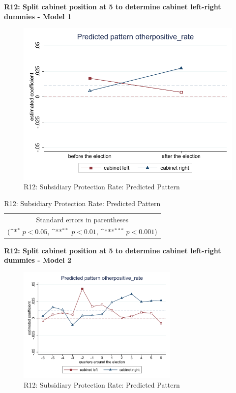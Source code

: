 \documentclass[10pt,a4paper]{scrartcl}
\begin{document}
\clearpage
\textbf{R12: Split cabinet position at 5 to determine cabinet left-right dummies - Model 1}
\begin{figure}[!ht]
	\centering
	\includegraphics[width=1\textwidth]{figures_edited/otherpositive_rate_graph1_R12.pdf}
	\caption{R12: Subsidiary Protection Rate: Predicted Pattern}
\end{figure}

\begin{table}[!ht]\centering
	\renewcommand{\arraystretch}{1.25}
	\def\sym#1{\ifmmode^{#1}\else\(^{#1}\)\fi}
	\caption{R12: Subsidiary Protection Rate: Predicted Pattern}
	\begin{tabular}{l*{2}{c}}
		\hline\hline
		
		\hline\hline
		\multicolumn{3}{c}{\footnotesize Standard errors in parentheses} \\
		\multicolumn{3}{c}{\footnotesize (\sym{*} \(p<0.05\), \sym{**} \(p<0.01\), \sym{***} \(p<0.001\))}\\
	\end{tabular}
\end{table}

\clearpage
\textbf{R12: Split cabinet position at 5 to determine cabinet left-right dummies - Model 2}
\begin{figure}[!ht]
	\centering
	\includegraphics[width=0.7\textwidth]{figures_edited/otherpositive_rate_graph2_R12.pdf}
	\caption{R12: Subsidiary Protection Rate: Predicted Pattern}
\end{figure}
\end{document}
